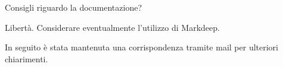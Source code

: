 \begin{spacing}{3}
\end{spacing}

\begin{minipage}[c]{0.47\textwidth}
\centering
Consigli riguardo la documentazione?
\end{minipage}
\hfill
\begin{minipage}[c]{0.47\textwidth}
\centering
Libertà. Considerare eventualmente l’utilizzo di Markdeep.
\end{minipage}

In seguito è stata mantenuta una corrispondenza tramite mail per ulteriori chiarimenti.
